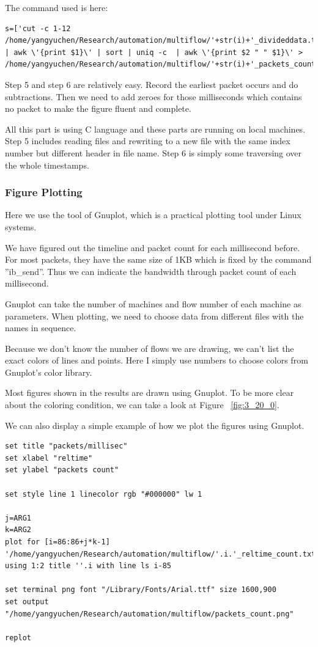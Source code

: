\documentclass[12pt,a4paper]{article}
\begin{document}
The command used is here:
\begin{lstlisting}
s=['cut -c 1-12 /home/yangyuchen/Research/automation/multiflow/'+str(i)+'_divideddata.txt | awk \'{print $1}\' | sort | uniq -c  | awk \'{print $2 " " $1}\' > /home/yangyuchen/Research/automation/multiflow/'+str(i)+'_packets_count.txt']
\end{lstlisting}


Step 5 and step 6 are relatively easy. 
Record the earliest packet occurs and do subtractions.
Then we need to add zeroes for those milliseconds which contains no packet to make the figure fluent and complete.

All this part is using C language and these parts are running on local machines.
Step 5 includes reading files and rewriting to a new file with the same index number but different header in file name.
Step 6 is simply some traversing over the whole timestamps.

\subsubsection{Figure Plotting}

Here we use the tool of Gnuplot, which is a practical plotting tool under Linux systems.

We have figured out the timeline and packet count for each millisecond before.
For most packets, they have the same size of 1KB which is fixed by the command ''ib\_send''.
Thus we can indicate the bandwidth through packet count of each millisecond.

Gnuplot can take the number of machines and flow number of each machine as parameters.
When plotting, we need to choose data from different files with the names in sequence.

Because we don't know the number of flows we are drawing, we can't list the exact colors of lines and points.
Here I simply use numbers to choose colors from Gnuplot's color library.

Most figures shown in the results are drawn using Gnuplot.
To be more clear about the coloring condition, we can take a look at Figure ~\ref{fig:3_20_0}.

We can also display a simple example of how we plot the figures using Gnuplot.
\begin{lstlisting}
set title "packets/millisec"
set xlabel "reltime"
set ylabel "packets count"

set style line 1 linecolor rgb "#000000" lw 1

j=ARG1
k=ARG2
plot for [i=86:86+j*k-1] '/home/yangyuchen/Research/automation/multiflow/'.i.'_reltime_count.txt' using 1:2 title ''.i with line ls i-85

set terminal png font "/Library/Fonts/Arial.ttf" size 1600,900
set output "/home/yangyuchen/Research/automation/multiflow/packets_count.png"

replot
\end{lstlisting}
\end{document}

